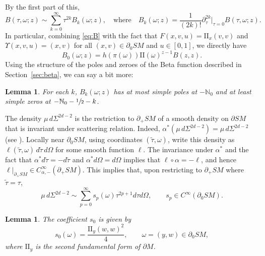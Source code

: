 \documentclass[JEP,XML,SOM,Unicode,NoFloatCountersInSection, NoEqCountersInSection,published]{cedram}
\theoremstyle{plain}
\newtheorem{Lemma}[Theorem]{Lemma}
\theoremstyle{definition}
\theoremstyle{remark}
\def\Nm{{\mathbb{N}}}
\def\two{\mathrm{II}}
\newcommand{\del}{\partial}
\begin{document}
By the first part of this,
\begin{equation}
B(\tau,\omega; z) \sim \sum_{k=0}^\infty \tau^{2k} B_{k}(\omega; z), \quad \mbox{where}\quad B_k(\omega; z) =
\frac{1}{(2k)!}\partial_\tau^{2k}|_{\tau=0} B(\tau,\omega; z).
\label{eq:Bexpansion}
\end{equation}
In particular, combining \eqref{eq:B} with the fact that $F(x,v,u) = \two_x(v,v)$ and $\Upsilon(x,v,u) = (x,v)$ for all $(x,v)\in \partial_0 SM$ and $u\in [0,1]$, we directly have
\begin{equation*}
B_0(\omega; z) = h(\pi(\omega)) \two(\omega)^{z-1} B(z,z).
\end{equation*}
Using the structure of the poles and zeroes of the Beta function described in Section~\ref{sec:beta}, we can say a bit more:
\begin{Lemma}\label{lem:Bk}
For each $k$, $B_k(\omega; z)$ has at most simple poles at $-\Nm_0$ and at least simple zeros at $-\Nm_0 - \sfrac{1}{2} - k$.
\end{Lemma}

The density $\mu \, d\Sigma^{2d-2}$ is the restriction to $\partial_+ SM$ of a smooth density on $\partial SM$ that is invariant under scattering relation. Indeed, $\alpha^* (\mu \, d\Sigma^{2d-2}) = \mu \, d\Sigma^{2d-2}$ (see \cite[Prop.\,3.6.10]{Paternain2021}).
Locally near $\partial_0 SM$, using coordinates $(\tilde\tau,\omega)$, write this density as $\ell(\tilde\tau, \omega)\,d\tilde\tau\,d\Omega$
for some smooth function $\ell$. The invariance under $\alpha^*$ and the fact that $\alpha^* d\tilde\tau = -d\tilde\tau$ and
$\alpha^* d\Omega = d\Omega$ implies that $\ell\circ \alpha = -\ell$, and hence $\ell|_{\partial_+ SM} \in C_{\alpha,-}^\infty(\partial_+ SM)$. This implies that, upon restricting to $\partial_+ SM$ where $\tilde\tau = \tau$,
\begin{equation}
\mu \, d\Sigma^{2d-2} \sim \sum_{p=0}^\infty s_{p} (\omega) \tau^{2p+1} d\tau d\Omega, \qquad s_{p}\in C^\infty(\partial_0 SM).
\label{eq:musig_expansion}
\end{equation}

\begin{Lemma}\label{lem:s0}
The coefficient $s_0$ is given by
\begin{equation}
s_0(\omega) = \frac{\two_y(w,w)^2}{4}, \qquad \omega = (y,w)\in \partial_0 SM,
\label{eq:s0}
\end{equation}
where $\two_y$ is the second fundamental form of $\del M$.
\end{Lemma}
\end{document}
